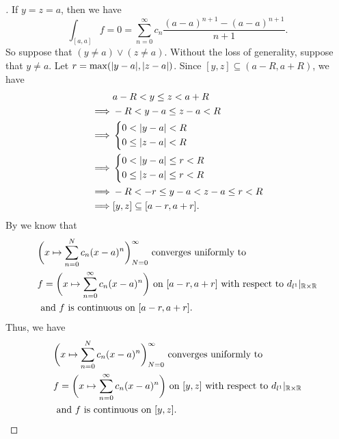 \begin{proof}[]
  If \(y = z = a\), then we have
  \[
    \int_{[a, a]} f = 0 = \sum_{n = 0}^\infty c_n \dfrac{(a - a)^{n + 1} - (a - a)^{n + 1}}{n + 1}.
  \]
  So suppose that \((y \neq a) \lor (z \neq a)\).
  Without the loss of generality, suppose that \(y \neq a\).
  Let \(r = \max(\abs{y - a}, \abs{z - a})\).
  Since \([y, z] \subseteq (a - R, a + R)\), we have
  \begin{align*}
             & a - R < y \leq z < a + R              \\
    \implies & -R < y - a \leq z - a < R             \\
    \implies & \begin{dcases}
                 0 < \left\lvert y - a\right\rvert < R \\
                 0 \leq \left\lvert z - a\right\rvert < R
               \end{dcases}                 \\
    \implies & \begin{dcases}
                 0 < \left\lvert y - a\right\rvert \leq r < R \\
                 0 \leq \left\lvert z - a\right\rvert \leq r < R
               \end{dcases}          \\
    \implies & -R < -r \leq y - a < z - a \leq r < R \\
    \implies & [y, z] \subseteq [a - r, a + r].
  \end{align*}
  By  we know that
  \begin{align*}
     & \bigg(x \mapsto \sum_{n = 0}^N c_n (x - a)^n\bigg)_{N = 0}^\infty \text{ converges uniformly to }                                       \\
     & f = \bigg(x \mapsto \sum_{n = 0}^\infty c_n (x - a)^n\bigg) \text{ on } [a - r, a + r] \text{ with respect to } d_{l^1}|_{\mathbb{R} \times \mathbb{R}} \\
     & \text{ and } f \text{ is continuous on } [a - r, a + r].
  \end{align*}
  Thus, we have
  \begin{align*}
     & \bigg(x \mapsto \sum_{n = 0}^N c_n (x - a)^n\bigg)_{N = 0}^\infty \text{ converges uniformly to }                               \\
     & f = \bigg(x \mapsto \sum_{n = 0}^\infty c_n (x - a)^n\bigg) \text{ on } [y, z] \text{ with respect to } d_{l^1}|_{\mathbb{R} \times \mathbb{R}} \\
     & \text{ and } f \text{ is continuous on } [y, z].
  \end{align*}

\end{proof}
